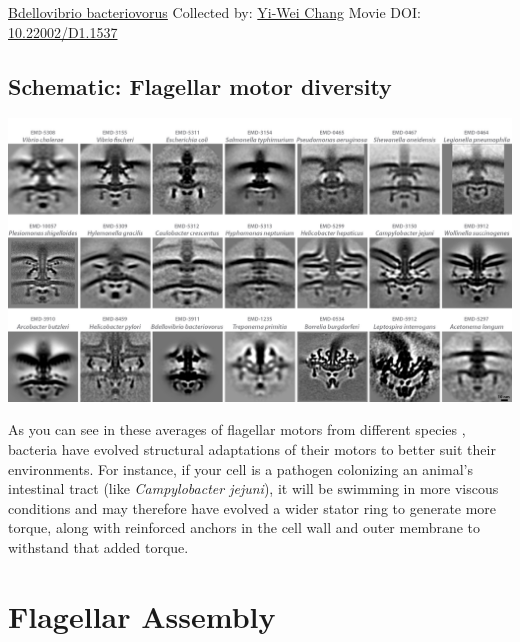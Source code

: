 \documentclass[]{tufte-book}
\begin{document}
\hypertarget{htmlwidget-f83b2e060c4f8910803d}{}

\label{fig:6-2a}\protect\hyperlink{tree}{Bdellovibrio bacteriovorus} Collected by: \protect\hyperlink{yi-wei_chang}{Yi-Wei Chang} Movie DOI: \href{https://doi.org/10.22002/D1.1537}{10.22002/D1.1537}

\hypertarget{Flagellar_motor_diversity}{%
\subsection*{Schematic: Flagellar motor diversity}\label{Flagellar_motor_diversity}}

\includegraphics{img/schematics/6_2_1}

As you can see in these averages of flagellar motors from different species \citep{murphy2006} \citep{chen2011} \citep{zhao2014} \citep{beeby2016} \citep{qin2017} \citep{chaban2018} \citep{kaplan2019} \citep{ferreira2019} \citep{chang2019}, bacteria have evolved structural adaptations of their motors to better suit their environments. For instance, if your cell is a pathogen colonizing an animal's intestinal tract (like \emph{Campylobacter jejuni}), it will be swimming in more viscous conditions and may therefore have evolved a wider stator ring to generate more torque, along with reinforced anchors in the cell wall and outer membrane to withstand that added torque.

\hypertarget{flagellar-assembly}{%
\section{Flagellar Assembly}\label{flagellar-assembly}}
\end{document}
